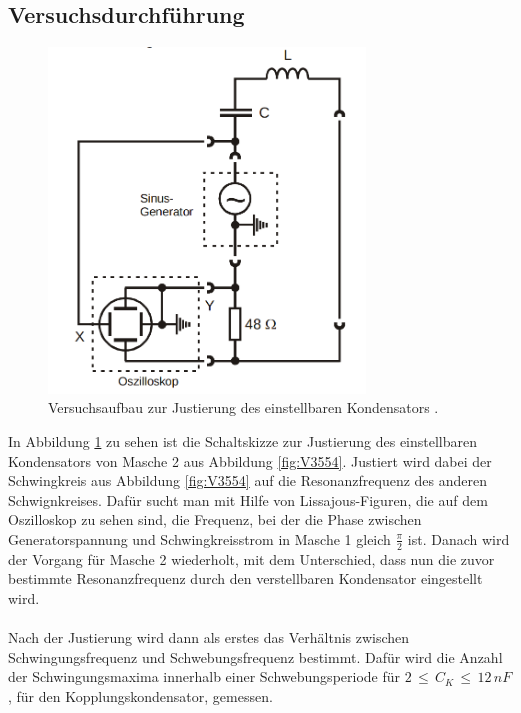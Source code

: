 \documentclass[
  bibliography=totoc,     %
  captions=tableheading,  %
  titlepage=firstiscover, %
]{scrartcl}
\begin{document}
\subsection{Versuchsdurchführung}
\label{sec:versuchsdurchführung}
\begin{figure}[htb]
  \centering
  \includegraphics[width=0.75\textwidth]{V3553.png}
  \caption{Versuchsaufbau zur Justierung des einstellbaren Kondensators \cite{anleitung}.}
  \label{fig:V3553}
\end{figure}
In Abbildung \ref{fig:V3553} zu sehen ist die Schaltskizze zur Justierung
des einstellbaren Kondensators von Masche 2 aus Abbildung \ref{fig:V3554}.
Justiert wird dabei der Schwingkreis aus Abbildung \ref{fig:V3554} auf die
Resonanzfrequenz des anderen Schwignkreises. Dafür sucht man mit Hilfe von
Lissajous-Figuren, die auf dem Oszilloskop zu sehen sind, die Frequenz, bei der
die Phase zwischen Generatorspannung und Schwingkreisstrom in Masche 1
gleich $\frac{\pi}{2}$ ist. Danach wird der Vorgang für Masche 2 wiederholt, mit
dem Unterschied, dass nun die zuvor bestimmte Resonanzfrequenz durch den
verstellbaren Kondensator eingestellt wird. \\
\\
Nach der Justierung wird dann als erstes das Verhältnis zwischen Schwingungsfrequenz
und Schwebungsfrequenz bestimmt. Dafür wird die Anzahl der Schwingungsmaxima
innerhalb einer Schwebungsperiode für $2\,\leq\,C_K\,\leq\,12\,nF$, für den
Kopplungskondensator, gemessen. \\
\\
\end{document}
